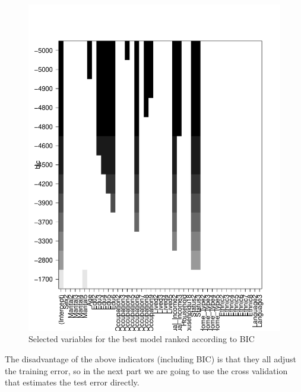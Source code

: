 \documentclass{article}
\begin{document}
\begin{figure}[h]
    \centering
    \includegraphics[scale=0.3]{BIC_PLOT.pdf}
    \caption{Selected variables for the best model ranked according to BIC}
    \label{BIC}
\end{figure}
The disadvantage of the above indicators (including BIC) is that they all adjust the training error, so in the next part we are going to use the cross validation that estimates the test error directly.
\end{document}
